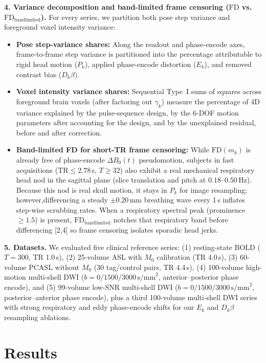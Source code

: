 \documentclass[11pt]{article}
\begin{document}
\textbf{4. Variance decomposition and band-limited frame censoring ($\text{FD}$ vs.\ $\text{FD}_{\text{bandlimited}}$).}
For every series, we partition both pose step variance and foreground voxel intensity variance:
\begin{itemize}
\item \textbf{Pose step-variance shares:} Along the readout and phase-encode axes, frame-to-frame step variance is partitioned into the percentage attributable to rigid head motion ($P_k$), applied phase-encode distortion ($E_k$), and removed contrast bias ($D_k\beta$).
\item \textbf{Voxel intensity variance shares:} Sequential Type~I sums of squares across foreground brain voxels (after factoring out $\gamma_k$) measure the percentage of 4D variance explained by the pulse-sequence design, by the 6-DOF motion parameters after accounting for the design, and by the unexplained residual, before and after correction.
\item \textbf{Band-limited FD for short-TR frame censoring:} While $\text{FD}(m_k)$ is already free of phase-encode $\Delta B_0(t)$ pseudomotion, subjects in fast acquisitions ($\text{TR} \le 2.78$\,s, $T \ge 32$) also exhibit a real mechanical respiratory head nod in the sagittal plane (slice translation and pitch at $0.18\text{--}0.50$\,Hz). Because this nod is real skull motion, it stays in $P_k$ for image resampling; however,differencing a steady $\pm 0.20$\,mm breathing wave every 1\,s inflates step-wise scrubbing rates. When a respiratory spectral peak (prominence $\ge 1.5$) is present, $\text{FD}_{\text{bandlimited}}$ notches that respiratory band before differencing [2,4] so frame censoring isolates sporadic head jerks.
\end{itemize}

\textbf{5. Datasets.}
We evaluated five clinical reference series: (1) resting-state BOLD ($T = 300$, TR 1.0\,s), (2) 25-volume ASL with $M_0$ calibration (TR 4.0\,s), (3) 60-volume PCASL without $M_0$ (30 tag/control pairs, TR 4.4\,s), (4) 100-volume high-motion multi-shell DWI ($b = 0/1500/3000\,\text{s/mm}^2$, anterior--posterior phase encode), and (5) 99-volume low-SNR multi-shell DWI ($b = 0/1500/3000\,\text{s/mm}^2$, posterior--anterior phase encode), plus a third 100-volume multi-shell DWI series with strong respiratory and eddy phase-encode shifts for our $E_k$ and $D_k\beta$ resampling ablations.

\section*{Results}
\end{document}
